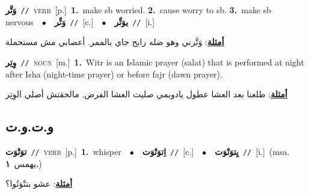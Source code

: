 \documentclass[10pt,a4paper,twoside]{article} %
\begin{document}
\begin{multicols}{2}
{\setlength\topsep{0pt}\textbf{\foreignlanguage{arabic}{وَتَّر}}\ {\color{gray}\texttt{//}\color{black}}\ \textsc{verb}\ [p.]\ \textbf{1.}~make sb worried.  \textbf{2.}~cause worry to sb.  \textbf{3.}~make sb nervous\ \ $\bullet$\ \ \setlength\topsep{0pt}\textbf{\foreignlanguage{arabic}{وَتِّر}}\ {\color{gray}\texttt{//}\color{black}}\ [c.]\ \ $\bullet$\ \ \setlength\topsep{0pt}\textbf{\foreignlanguage{arabic}{يوَتِّر}}\ {\color{gray}\texttt{//}\color{black}}\ [i.]\  \begin{flushright}\color{gray}\foreignlanguage{arabic}{\textbf{\underline{\foreignlanguage{arabic}{أمثلة}}}: وَتَّرني وهو ضله رايح جاي بالممر. أعصابي مش مستحملة}\end{flushright}\color{black}} \vspace{2mm}

{\setlength\topsep{0pt}\textbf{\foreignlanguage{arabic}{وِتِر}}\ {\color{gray}\texttt{//}\color{black}}\ \textsc{noun}\ [m.]\ \textbf{1.}~Witr is an Islamic prayer (salat) that is performed at night after Isha (night-time prayer) or before fajr (dawn prayer).\  \begin{flushright}\color{gray}\foreignlanguage{arabic}{\textbf{\underline{\foreignlanguage{arabic}{أمثلة}}}: طلعنا بعد العشا عطول يادوبمي صليت العشا الفرض. مالحقتش أصلي الوِتِر}\end{flushright}\color{black}} \vspace{2mm}

\vspace{-3mm}
\subsection*{\color{blue}\foreignlanguage{arabic}{و.ت.و.ت}\color{blue}{}} 

{\setlength\topsep{0pt}\textbf{\foreignlanguage{arabic}{توَتْوَت}}\ {\color{gray}\texttt{//}\color{black}}\ \textsc{verb}\ [p.]\ \textbf{1.}~whisper\ \ $\bullet$\ \ \setlength\topsep{0pt}\textbf{\foreignlanguage{arabic}{اِتوَتْوَت}}\ {\color{gray}\texttt{//}\color{black}}\ [c.]\ \ $\bullet$\ \ \setlength\topsep{0pt}\textbf{\foreignlanguage{arabic}{يِتوَتْوَت}}\ {\color{gray}\texttt{//}\color{black}}\ [i.]\ \color{gray}(msa. \foreignlanguage{arabic}{يهمس}~\foreignlanguage{arabic}{\textbf{١.}})\color{black}\  \begin{flushright}\color{gray}\foreignlanguage{arabic}{\textbf{\underline{\foreignlanguage{arabic}{أمثلة}}}: عشو بتتْوَتُوا؟}\end{flushright}\color{black}} \vspace{2mm}


\end{multicols}
\end{document}
